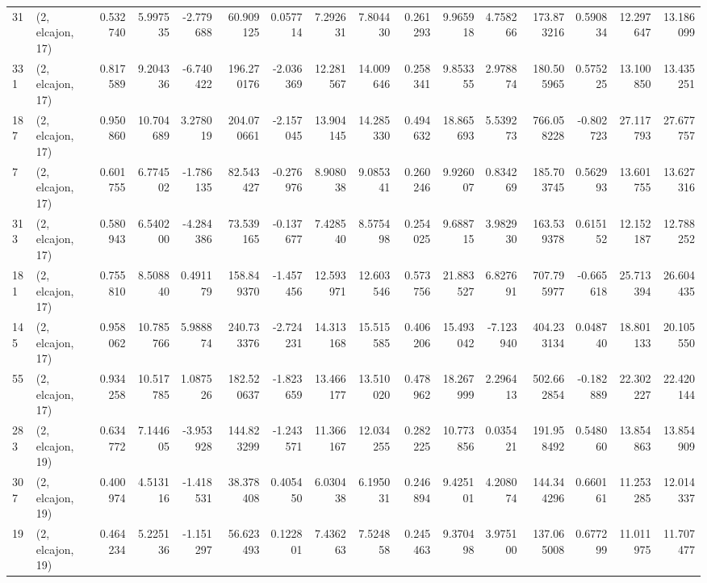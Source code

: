 \begin{tabular}{llrrrrrrrrrrrrrr}
31  &  (2, elcajon, 17) &   0.532740 &   5.997535 &  -2.779688 &    60.909125 &   0.057714 &   7.292631 &   7.804430 &  0.261293 &   9.965918 &   4.758266 &   173.873216 &  0.590834 &  12.297647 &  13.186099 \\
331 &  (2, elcajon, 17) &   0.817589 &   9.204336 &  -6.740422 &   196.270176 &  -2.036369 &  12.281567 &  14.009646 &  0.258341 &   9.853355 &   2.978874 &   180.505965 &  0.575225 &  13.100850 &  13.435251 \\
187 &  (2, elcajon, 17) &   0.950860 &  10.704689 &   3.278019 &   204.070661 &  -2.157045 &  13.904145 &  14.285330 &  0.494632 &  18.865693 &   5.539273 &   766.058228 & -0.802723 &  27.117793 &  27.677757 \\
7   &  (2, elcajon, 17) &   0.601755 &   6.774502 &  -1.786135 &    82.543427 &  -0.276976 &   8.908038 &   9.085341 &  0.260246 &   9.926007 &   0.834269 &   185.703745 &  0.562993 &  13.601755 &  13.627316 \\
313 &  (2, elcajon, 17) &   0.580943 &   6.540200 &  -4.284386 &    73.539165 &  -0.137677 &   7.428540 &   8.575498 &  0.254025 &   9.688715 &   3.982930 &   163.539378 &  0.615152 &  12.152187 &  12.788252 \\
181 &  (2, elcajon, 17) &   0.755810 &   8.508840 &   0.491179 &   158.849370 &  -1.457456 &  12.593971 &  12.603546 &  0.573756 &  21.883527 &   6.827691 &   707.795977 & -0.665618 &  25.713394 &  26.604435 \\
145 &  (2, elcajon, 17) &   0.958062 &  10.785766 &   5.988874 &   240.733376 &  -2.724231 &  14.313168 &  15.515585 &  0.406206 &  15.493042 &  -7.123940 &   404.233134 &  0.048740 &  18.801133 &  20.105550 \\
55  &  (2, elcajon, 17) &   0.934258 &  10.517785 &   1.087526 &   182.520637 &  -1.823659 &  13.466177 &  13.510020 &  0.478962 &  18.267999 &   2.296413 &   502.662854 & -0.182889 &  22.302227 &  22.420144 \\
283 &  (2, elcajon, 19) &   0.634772 &   7.144605 &  -3.953928 &   144.823299 &  -1.243571 &  11.366167 &  12.034255 &  0.282225 &  10.773856 &   0.035421 &   191.958492 &  0.548060 &  13.854863 &  13.854909 \\
307 &  (2, elcajon, 19) &   0.400974 &   4.513116 &  -1.418531 &    38.378408 &   0.405450 &   6.030438 &   6.195031 &  0.246894 &   9.425101 &   4.208074 &   144.344296 &  0.660161 &  11.253285 &  12.014337 \\
19  &  (2, elcajon, 19) &   0.464234 &   5.225136 &  -1.151297 &    56.623493 &   0.122801 &   7.436263 &   7.524858 &  0.245463 &   9.370498 &   3.975100 &   137.065008 &  0.677299 &  11.011975 &  11.707477 \\

\end{tabular}
